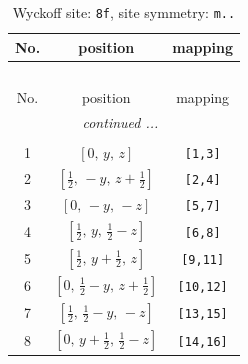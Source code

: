 \documentclass[fleqn,8pt]{jsarticle}
\begin{document}
\begin{longtable}{ccc}
\caption{Wyckoff site: {\tt 8f}, site symmetry: {\tt m..}}
 \\
 \hline \hline
No. & position & mapping \\ \hline \endfirsthead

\multicolumn{2}{l}{\tablename\ \thetable{}} \\
 \hline \hline
No. & position & mapping \\ \hline \endhead

 \hline \hline
\multicolumn{2}{r}{\footnotesize\it continued ...} \\ \endfoot

 \hline \hline
\multicolumn{2}{r}{} \\ \endlastfoot

1 & $\left[ 0,\, y,\, z \right]$ & {\tt [1,3]} \\ \hline
2 & $\left[ \frac{1}{2},\, - y,\, z + \frac{1}{2} \right]$ & {\tt [2,4]} \\ \hline
3 & $\left[ 0,\, - y,\, - z \right]$ & {\tt [5,7]} \\ \hline
4 & $\left[ \frac{1}{2},\, y,\, \frac{1}{2} - z \right]$ & {\tt [6,8]} \\ \hline
5 & $\left[ \frac{1}{2},\, y + \frac{1}{2},\, z \right]$ & {\tt [9,11]} \\ \hline
6 & $\left[ 0,\, \frac{1}{2} - y,\, z + \frac{1}{2} \right]$ & {\tt [10,12]} \\ \hline
7 & $\left[ \frac{1}{2},\, \frac{1}{2} - y,\, - z \right]$ & {\tt [13,15]} \\ \hline
8 & $\left[ 0,\, y + \frac{1}{2},\, \frac{1}{2} - z \right]$ & {\tt [14,16]} \\
\end{longtable}
\renewcommand{\arraystretch}{1.2}
\end{document}
